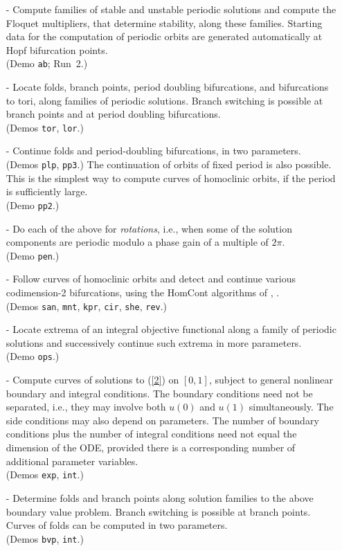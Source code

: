 \documentclass[12pt]{report}
\begin{document}
\begin{itemize}
\item[-]
  Compute families of stable and unstable periodic
  solutions and
  compute the Floquet multipliers, that determine stability, along
  these families.
  Starting data for the computation of periodic orbits are
  generated automatically at Hopf bifurcation points. \\
  (Demo {\tt ab}; Run~2.)
\item[-]
  Locate folds, branch points, period doubling bifurcations,
  and bifurcations to tori, along families of periodic solutions. 
  Branch switching is possible at branch points and at period 
  doubling bifurcations.  \\
  (Demos {\tt tor}, {\tt lor}.)
\item[-]  Continue folds and period-doubling bifurcations, 
  in two parameters. \\ (Demos {\tt plp}, {\tt pp3}.)
  The continuation of orbits of fixed period is also
  possible. This is the simplest way to compute curves of
  homoclinic orbits, if the period is sufficiently large.
  \\ (Demo {\tt pp2}.)
\item[-]  Do each of the above for {\it rotations}, i.e., when some of the
  solution components are periodic modulo a phase gain of a
  multiple of $2 \pi$. \\
  (Demo {\tt pen}.)
\item[-]  Follow curves of homoclinic orbits and detect and continue
  various codimension-2 bifurcations, using the {\cal HomCont} algorithms of 
   \citeyear{ChKu:94},
   \citeyear{ChKuSa:95}.\\
  (Demos  {\tt san}, {\tt mnt}, {\tt kpr}, {\tt cir},
  {\tt she}, {\tt rev}.)
\item[-]  Locate extrema of an integral objective functional along a family 
  of periodic solutions and successively continue such extrema 
  in more parameters. \\
  (Demo {\tt ops}.)
\item[-]
  Compute curves of solutions to (\ref{2}) on $[0,1]$, subject to general
  nonlinear boundary and integral conditions.
  The boundary conditions need not be separated, i.e., they may
  involve both $u(0)$ and $u(1)$ simultaneously.
  The side conditions may also depend on parameters.
  The number of boundary conditions plus the number of integral
  conditions need not equal the dimension of the ODE, 
  provided there is a corresponding number of additional
  parameter variables. \\
  (Demos {\tt exp}, {\tt int}.)
\item[-]
  Determine folds and branch points along
  solution families to the above boundary value problem.
  Branch switching is possible at branch points.
  Curves of folds can be computed in two parameters.\\
  (Demos {\tt bvp}, {\tt int}.)
\end{itemize}
 
\end{document}
